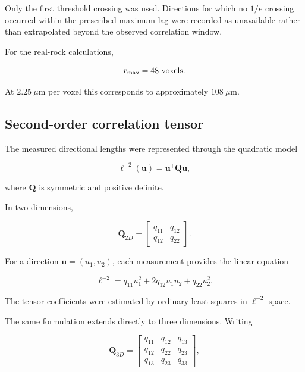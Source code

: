 \documentclass{article}
\begin{document}
Only the first threshold crossing was used. Directions for which no
$1/e$ crossing occurred within the prescribed maximum lag were recorded
as unavailable rather than extrapolated beyond the observed correlation
window.

For the real-rock calculations,

\begin{equation}
    r_{\max}=48\ {\rm voxels}.
\end{equation}

At $2.25~\mu$m per voxel this corresponds to approximately
$108~\mu$m.

\subsection{Second-order correlation tensor}
\label{sec:SI_tensor}

The measured directional lengths were represented through the quadratic model

\begin{equation}
    \ell^{-2}(\mathbf{u})
    =
    \mathbf{u}^{\mathsf T}
    \mathbf{Q}
    \mathbf{u},
    \label{eq:SI_tensor}
\end{equation}

where $\mathbf{Q}$ is symmetric and positive definite.

In two dimensions,

\begin{equation}
    \mathbf{Q}_{2D}
    =
    \begin{bmatrix}
    q_{11} & q_{12}\\
    q_{12} & q_{22}
    \end{bmatrix}.
\end{equation}

For a direction
$\mathbf{u}=(u_1,u_2)$, each measurement provides the linear equation

\begin{equation}
    \ell^{-2}
    =
    q_{11}u_1^2
    +
    2q_{12}u_1u_2
    +
    q_{22}u_2^2.
\end{equation}

The tensor coefficients were estimated by ordinary least squares in
$\ell^{-2}$ space.

The same formulation extends directly to three dimensions. Writing

\begin{equation}
    \mathbf{Q}_{3D}
    =
    \begin{bmatrix}
    q_{11} & q_{12} & q_{13}\\
    q_{12} & q_{22} & q_{23}\\
    q_{13} & q_{23} & q_{33}
    \end{bmatrix},
\end{equation}
\end{document}
